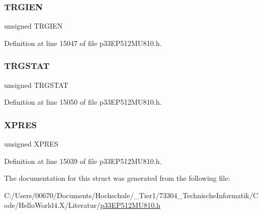 \subsubsection{\texorpdfstring{T\+R\+G\+I\+EN}{TRGIEN}}
{\footnotesize\ttfamily unsigned T\+R\+G\+I\+EN}



Definition at line 15047 of file p33\+E\+P512\+M\+U810.\+h.

\mbox{\label{structtag_p_w_m_c_o_n5_b_i_t_s_a57c6135a12bae69a2a2cac5ed50a4a6d}} 
\subsubsection{\texorpdfstring{T\+R\+G\+S\+T\+AT}{TRGSTAT}}
{\footnotesize\ttfamily unsigned T\+R\+G\+S\+T\+AT}



Definition at line 15050 of file p33\+E\+P512\+M\+U810.\+h.

\mbox{\label{structtag_p_w_m_c_o_n5_b_i_t_s_a6a3f824223966417e0005dbe08b1833c}} 
\subsubsection{\texorpdfstring{X\+P\+R\+ES}{XPRES}}
{\footnotesize\ttfamily unsigned X\+P\+R\+ES}



Definition at line 15039 of file p33\+E\+P512\+M\+U810.\+h.



The documentation for this struct was generated from the following file\+:\begin{DoxyCompactItemize}
\item 
C\+:/\+Users/00670/\+Documents/\+Hochschule/\+\_\+\+Tier1/73304\+\_\+\+Technische\+Informatik/\+Code/\+Hello\+World4.\+X/\+Literatur/\hyperlink{p33_e_p512_m_u810_8h}{p33\+E\+P512\+M\+U810.\+h}\end{DoxyCompactItemize}
